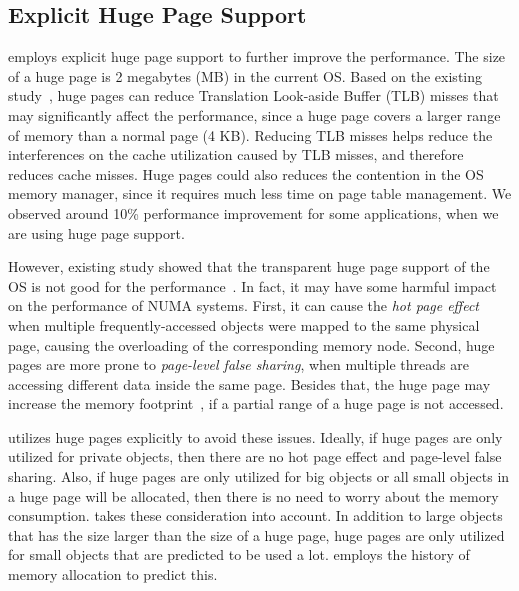 \subsection{Explicit Huge Page Support} 
\label{sec:hugepage}
\NA{} employs explicit huge page support to further improve the performance. The size of a huge page is 2 megabytes (MB) in the current OS. Based on the existing study~\cite{hugepages}, huge pages can reduce Translation Look-aside Buffer (TLB) misses that may significantly affect the performance, since a huge page covers a larger range of memory than a normal page (4 KB). Reducing TLB misses helps reduce the interferences on the cache utilization caused by TLB misses, and therefore reduces cache misses. Huge pages could also reduces the contention in the OS memory manager, since it requires much less time on page table management. We observed around 10\% performance improvement for some applications, when we are using huge page support. 

However, existing study showed that the transparent huge page support of the OS is not good for the performance~\cite{Gaud:2014:LPM:2643634.2643659, DBLP:conf/asplos/PanwarBG19}. In fact, it may have some harmful impact on the performance of NUMA systems. First, it can cause the \textit{hot page effect} when multiple frequently-accessed objects  were  mapped  to  the  same  physical  page, causing the overloading of the corresponding memory node. Second, huge pages are more prone to \textit{page-level false sharing}, when multiple threads are accessing different data inside the same page. Besides that, the huge page may increase the memory footprint~\cite{DBLP:conf/asplos/MaasAIJMR20}, if a partial range of a huge page is not accessed. 

\NA{} utilizes huge pages explicitly to avoid these issues. Ideally, if huge pages are only utilized for private objects, then there are no hot page effect and page-level false sharing. Also, if huge pages are only utilized for big objects or all small objects in a huge page will be allocated, then there is no need to worry about the memory consumption. \NA{} takes these consideration into account. In addition to large objects that has the size larger than the size of a huge page, huge pages are only utilized for small objects that are predicted to be used a lot.  \NA{} employs the history of memory allocation to predict this. 

